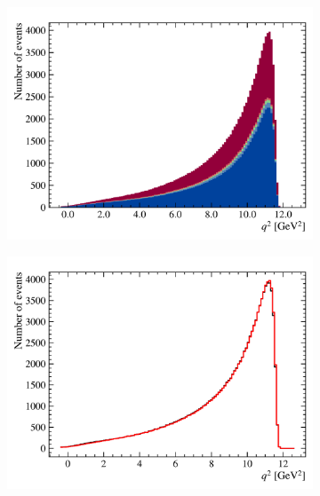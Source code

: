 \begin{figure}[!htb]
\begin{subfigure}[b]{0.32\textwidth}
        \includegraphics[width=\textwidth]{figs-fit-fit-templates/data-driven-plots/misid/D0_q2_smr.pdf}
    \end{subfigure}
    \hfill
    \begin{subfigure}[b]{0.32\textwidth}
        \centering
        \includegraphics[width=\textwidth]{figs-fit-fit-templates/data-driven-plots/misid/D0_q2_comp.pdf}
    \end{subfigure}
    \\
    \begin{subfigure}[b]{0.32\textwidth}
        \centering

\end{subfigure}
\end{figure}
